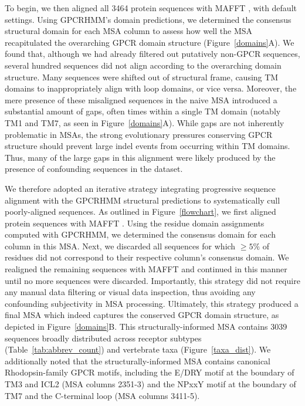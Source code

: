 \documentclass[fleqn,10pt]{wlpeerj}
\begin{document}
To begin, we then aligned all 3464 protein sequences with MAFFT \citep{mafftv7}, with default settings. Using GPCRHMM's domain predictions, we determined the consensus structural domain for each MSA column to assess how well the MSA recapitulated the overarching GPCR domain structure (Figure~\ref{domains}A). We found that, although we had already filtered out putatively non-GPCR sequences, several hundred sequences did not align according to the overarching domain structure. Many sequences were shifted out of structural frame, causing TM domains to inappropriately align with loop domains, or vice versa. Moreover, the mere presence of these misaligned sequences in the naive MSA introduced a substantial amount of gaps, often times within a single TM domain (notably TM1 and TM7, as seen in Figure~\ref{domains}A). While gaps are not inherently problematic in MSAs, the strong evolutionary pressures conserving GPCR structure should prevent large indel events from occurring within TM domains. Thus, many of the large gaps in this alignment were likely produced by the presence of confounding sequences in the dataset.

We therefore adopted an iterative strategy integrating progressive sequence alignment with the GPCRHMM structural predictions to systematically cull poorly-aligned sequences. As outlined in Figure~\ref{flowchart}, we first aligned protein sequences with MAFFT \citep{mafftv7}. Using the residue domain assignments computed with GPCRHMM, we determined the consensus domain for each column in this MSA. Next, we discarded all sequences for which $\geq 5\%$ of residues did not correspond to their respective column's consensus domain. We realigned the remaining sequences with MAFFT and continued in this manner until no more sequences were discarded. Importantly, this strategy did not require any manual data filtering or visual data inspection, thus avoiding any confounding subjectivity in MSA processing. Ultimately, this strategy produced a final MSA which indeed captures the conserved GPCR domain structure, as depicted in Figure~\ref{domains}B. This structurally-informed MSA contains 3039 sequences broadly distributed across receptor subtypes (Table~\ref{tab:abbrev_count}) and vertebrate taxa (Figure~\ref{taxa_dist}). We additionally noted that the structurally-informed MSA contains canonical Rhodopsin-family GPCR motifs, including the E/DRY motif at the boundary of TM3 and ICL2 (MSA columns 2351-3) and the NPxxY motif at the boundary of TM7 and the C-terminal loop (MSA columns 3411-5).
\end{document}
